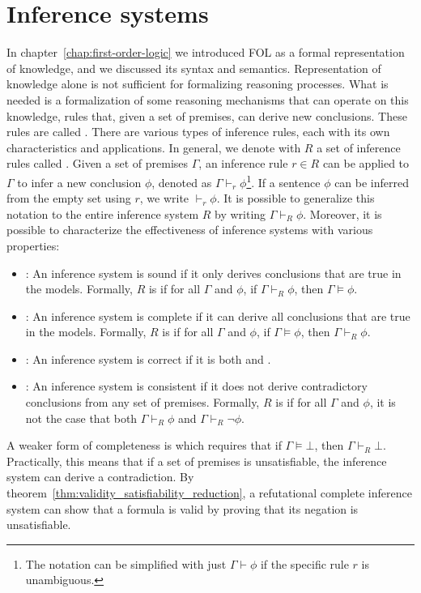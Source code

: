 \chapter{Inference systems}\label{chap:inference-systems}

In chapter~\ref{chap:first-order-logic} we introduced FOL as a formal representation of knowledge, and we discussed its syntax and semantics.
Representation of knowledge alone is not sufficient for formalizing reasoning processes.
What is needed is a formalization of some reasoning mechanisms that can operate on this knowledge, rules that, given a set of premises, can derive new conclusions.
These rules are called .
There are various types of inference rules, each with its own characteristics and applications.
In general, we denote with \(R\) a set of inference rules called . Given a set of premises \(\Gamma\), an inference rule \(r \in R\) can be applied to \(\Gamma\) to infer a new conclusion \(\phi\), denoted as \(\Gamma \vdash_r \phi\)\footnote{
  The notation can be simplified with just \(\Gamma \vdash \phi\) if the specific rule \(r\) is unambiguous.}.
If a sentence \(\phi\) can be inferred from the empty set using \(r\), we write \(\vdash_r \phi\).
It is possible to generalize this notation to the entire inference system \(R\) by writing \(\Gamma \vdash_{R} \phi\).
Moreover, it is possible to characterize the effectiveness of inference systems with various properties:

\begin{itemize}
    \item {}: An inference system is sound if it only derives conclusions that are true in the models. Formally, \(R\) is  if for all \(\Gamma\) and \(\phi\), if \(\Gamma \vdash_{R} \phi\), then \(\Gamma\models\phi\).
    \item {}: An inference system is complete if it can derive all conclusions that are true in the models. Formally, \(R\) is  if for all \(\Gamma\) and \(\phi\), if \(\Gamma\models\phi\), then \(\Gamma \vdash_{R} \phi\).
    \item {}: An inference system is correct if it is both  and .
    \item {}: An inference system is consistent if it does not derive contradictory conclusions from any set of premises. Formally, \(R\) is  if for all \(\Gamma\) and \(\phi\), it is not the case that both \(\Gamma \vdash_{R} \phi\) and \(\Gamma \vdash_{R} \neg \phi\).
\end{itemize}
A weaker form of completeness is  which requires that if \(\Gamma \models \bot\), then \(\Gamma \vdash_{R} \bot\).  Practically, this means that if a set of premises is unsatisfiable, the inference system can derive a contradiction.
By theorem~\ref{thm:validity_satisfiability_reduction}, a refutational complete inference system can show that a formula is valid by proving that its negation is unsatisfiable.

